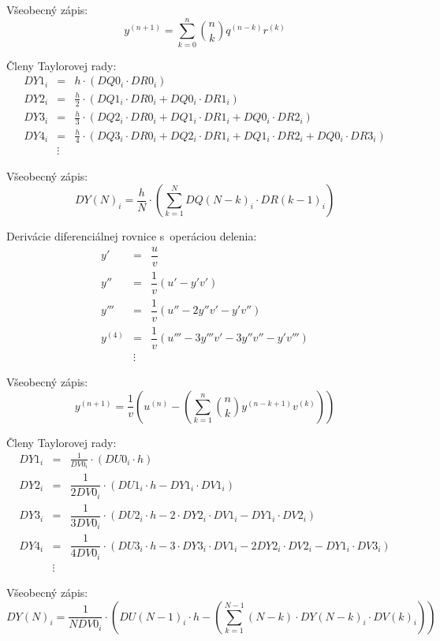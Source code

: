 Všeobecný zápis:
\begin{equation}
y^{(n+1)} = \sum_{k=0}^n \binom{n}{k} q^{(n-k)} r^{(k)} \nonumber
\end{equation}

\bigskip
\bigskip

Členy Taylorovej rady:
\begin{eqnarray}
DY1_{i} &=& h \cdot ( DQ0_{i} \cdot DR0_{i} ) \nonumber \\
DY2_{i} &=& \frac{h}{2} \cdot ( DQ1_{i} \cdot DR0_{i} + DQ0_{i} \cdot DR1_{i}) \nonumber \\
DY3_{i} &=& \frac{h}{3} \cdot ( DQ2_{i} \cdot DR0_{i} + DQ1_{i} \cdot DR1_{i} + DQ0_{i} \cdot DR2_{i}) \nonumber \\
DY4_{i} &=& \frac{h}{4} \cdot (DQ3_{i} \cdot DR0_{i} + DQ2_{i} \cdot DR1_{i} + DQ1_{i} \cdot DR2_{i} + DQ0_{i} \cdot DR3_{i}) \nonumber \\
 & \vdots \nonumber &
\end{eqnarray}

Všeobecný zápis:
\begin{equation}
DY(N)_{i} = \dfrac{h}{N} \cdot \left( \sum_{k=1}^N DQ(N-k)_{i} \cdot DR(k-1)_{i} \right) \nonumber
\end{equation}

\newpage

Derivácie diferenciálnej rovnice s~operáciou delenia:
\begin{eqnarray}
y' & = & \dfrac{u}{v} \nonumber \\
y'' & = & \dfrac{1}{v} (u' - y'v') \nonumber \\
y''' & = & \dfrac{1}{v} (u'' - 2y''v' - y'v'') \nonumber \\
y^{(4)} & = & \dfrac{1}{v} (u''' - 3y'''v' - 3y''v'' - y'v''') \nonumber \\
 & \vdots \nonumber &
\end{eqnarray}

Všeobecný zápis:
\begin{equation}
y^{(n+1)} = \dfrac{1}{v} \left( u^{(n)} - \left( \sum_{k=1}^n \binom{n}{k} y^{(n-k+1)} v^{(k)} \right) \right) \nonumber
\end{equation}

\bigskip
\bigskip

Členy Taylorovej rady:
\begin{eqnarray}
DY1_{i} & = & \frac{1}{DV0_{i}} \cdot (DU0_{i} \cdot h) \nonumber \\
DY2_{i} & = & \dfrac{1}{2DV0_{i}} \cdot (DU1_{i} \cdot h - DY1_{i} \cdot DV1_{i}) \nonumber \\
DY3_{i} & = & \dfrac{1}{3DV0_{i}} \cdot ( DU2_{i} \cdot h - 2 \cdot DY2_{i} \cdot DV1_{i} - DY1_{i} \cdot DV2_{i} ) \nonumber \\
DY4_{i} & = & \dfrac{1}{4DV0_{i}} \cdot ( DU3_{i} \cdot h - 3 \cdot DY3_{i} \cdot DV1_{i} - 2DY2_{i} \cdot DV2_{i} - DY1_{i} \cdot DV3_{i} ) \nonumber \\
& \vdots \nonumber & 
\end{eqnarray}

Všeobecný zápis:
\begin{equation}
DY(N)_{i} = \dfrac{1}{N DV0_{i}} \cdot \left( DU(N-1)_{i} \cdot h - \left( \sum_{k=1}^{N-1} (N-k) \cdot DY(N-k)_{i} \cdot DV(k)_{i} \right) \right) \nonumber
\end{equation}





